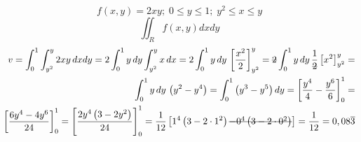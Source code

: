 \begin{enumerate}
	\begin{equation*}
		f(x,y) = 2xy;\; 0 \leq y \leq 1;\; y^2 \leq x \leq y
	\end{equation*}
	\begin{equation*}
		\iint_R f(x, y) dx dy
	\end{equation*}
	\begin{align*}
		v = \int_0^1 \int_{y^2}^y 2xy\, dx dy = 2\int_0^1 y\, dy \int_{y^2}^y x\, dx = 2\int_0^1 y\, dy\, \left[\dfrac{x^2}{2}\right]_{y^2}^y = \overstrike{2}\int_0^1 y\, dy\, \dfrac{1}{\overstrike{2}}\left[x^2\right]_{y^2}^y =\\ \int_0^1 y\, dy\, \left(y^2 - y^4\right) = \int_0^1 \left(y^3 - y^5\right) dy = \left[\frac{y^4}{4} - \frac{y^6}{6}\right]_0^1 =\\ \left[\dfrac{6y^4 - 4y^6}{24}\right]_0^1 = \left[\dfrac{2y^4\left(3 - 2y^2\right)}{24}\right]_0^1 = \dfrac{1}{12}\left[1^4\left(3 - 2\cdot1^2\right) \overstrike{- 0^4\left(3 - 2\cdot0^2\right)}\right] = \dfrac{1}{12} = 0,08\overline{3}
	\end{align*}
\end{enumerate}